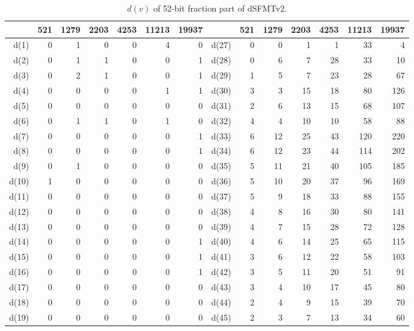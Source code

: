 \documentclass{svmult}
\begin{document}
\begin{table}
  \begin{center}
    \caption{$d(v)$ of 52-bit fraction part of dSFMTv2.}
    \label{tab:dd}
    \begin{tabular}{|r|rrrrrr||r|rrrrrr|} \hline
      & 521 & 1279 & 2203 & 4253 & 11213 & 19937 
      & & 521 & 1279 & 2203 & 4253 & 11213 & 19937 \\ \hline
      d(1) & 0 & 1 & 0 & 0 & 4 & 0 & d(27) & 0 & 0 & 1 & 1 & 33 & 4 \\
      d(2) & 0 & 1 & 1 & 0 & 0 & 1 & d(28) & 0 & 6 & 7 & 28 & 33 & 10 \\
      d(3) & 0 & 2 & 1 & 0 & 0 & 1 & d(29) & 1 & 5 & 7 & 23 & 28 & 67 \\
      d(4) & 0 & 0 & 0 & 0 & 1 & 1 & d(30) & 3 & 3 & 15 & 18 & 80 & 126 \\
      d(5) & 0 & 0 & 0 & 0 & 0 & 0 & d(31) & 2 & 6 & 13 & 15 & 68 & 107 \\
      d(6) & 0 & 1 & 1 & 0 & 1 & 0 & d(32) & 4 & 4 & 10 & 10 & 58 & 88 \\
      d(7) & 0 & 0 & 0 & 0 & 0 & 1 & d(33) & 6 & 12 & 25 & 43 & 120 & 220 \\
      d(8) & 0 & 0 & 0 & 0 & 0 & 1 & d(34) & 6 & 12 & 23 & 44 & 114 & 202 \\
      d(9) & 0 & 1 & 0 & 0 & 0 & 0 & d(35) & 5 & 11 & 21 & 40 & 105 & 185 \\
      d(10) & 1 & 0 & 0 & 0 & 0 & 0 & d(36) & 5 & 10 & 20 & 37 & 96 & 169 \\
      d(11) & 0 & 0 & 0 & 0 & 0 & 0 & d(37) & 5 & 9 & 18 & 33 & 88 & 155 \\
      d(12) & 0 & 0 & 0 & 0 & 0 & 0 & d(38) & 4 & 8 & 16 & 30 & 80 & 141 \\
      d(13) & 0 & 0 & 0 & 0 & 0 & 0 & d(39) & 4 & 7 & 15 & 28 & 72 & 128 \\
      d(14) & 0 & 0 & 0 & 0 & 0 & 1 & d(40) & 4 & 6 & 14 & 25 & 65 & 115 \\
      d(15) & 0 & 0 & 0 & 0 & 0 & 1 & d(41) & 3 & 6 & 12 & 22 & 58 & 103 \\
      d(16) & 0 & 0 & 0 & 0 & 0 & 1 & d(42) & 3 & 5 & 11 & 20 & 51 & 91 \\
      d(17) & 0 & 0 & 0 & 0 & 0 & 0 & d(43) & 3 & 4 & 10 & 17 & 45 & 80 \\
      d(18) & 0 & 0 & 0 & 0 & 0 & 0 & d(44) & 2 & 4 & 9 & 15 & 39 & 70 \\
      d(19) & 0 & 0 & 0 & 0 & 0 & 0 & d(45) & 2 & 3 & 7 & 13 & 34 & 60 \\

\end{tabular}
\end{center}
\end{table}
\end{document}
